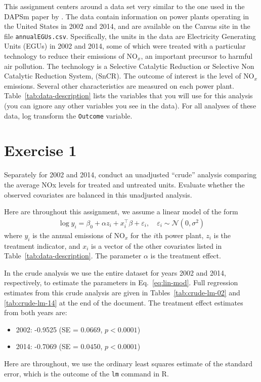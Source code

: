 \begin{quoting}
  This assignment centers around a data set very similar to the one
  used in the DAPSm paper by \cite{papadogeorgou2018adjusting}. The
  data contain information on power plants operating in the United
  States in 2002 and 2014, and are available on the Canvas site in the
  file \texttt{annualEGUs.csv}. Specifically, the units in the data
  are Electricity Generating Units (EGUs) in 2002 and 2014, some of
  which were treated with a particular technology to reduce their
  emissions of $\text{NO}_x$, an important precursor to harmful air
  pollution. The technology is a Selective Catalytic Reduction or
  Selective Non Catalytic Reduction System, (SnCR). The outcome of
  interest is the level of $\text{NO}_x$ emissions. Several other
  characteristics are measured on each power
  plant. Table~\ref{tab:data-description} lists the variables that you
  will use for this analysis (you can ignore any other variables you
  see in the data). For all analyses of these data, log transform the
  \texttt{Outcome} variable.
\end{quoting}

\section{Exercise 1}

\begin{quoting}
  Separately for 2002 and 2014, conduct an unadjusted ``crude'' analysis
  comparing the average NOx levels for treated and untreated
  units. Evaluate whether the observed covariates are balanced in this
  unadjusted analysis.
\end{quoting}

Here are throughout this assignment, we assume a linear model of the
form
\begin{align}
  \label{eq:lin-mod}
  \log y_i = \beta_0 + \alpha z_i + x_i^\intercal \beta + \varepsilon_i,
  \quad \varepsilon_i \sim \mathcal{N}(0, \sigma^2)
\end{align}
where $y_i$ is the annual emissions of NO$_x$ for the $i$th power
plant, $z_i$ is the treatment indicator, and $x_i$ is a vector of the
other covariates listed in Table~\ref{tab:data-description}.  The
parameter $\alpha$ is the treatment effect.

In the crude analysis we use the entire dataset for years 2002 and
2014, respectively, to estimate the parameters in
Eq.~\eqref{eq:lin-mod}.  Full regression estimates from this crude
analysis are given in Tables~\ref{tab:crude-lm-02} and
\ref{tab:crude-lm-14} at the end of the document.  The treatment
effect estimates from both years are:
\begin{itemize}
\item 2002: -0.9525 (SE = $0.0669$, $p < 0.0001$)
\item 2014: -0.7069 (SE = $0.0450$, $p < 0.0001$)
\end{itemize}
Here are throughout, we use the ordinary least squares estimate of the
standard error, which is the outcome of the \texttt{lm} command in R.  

